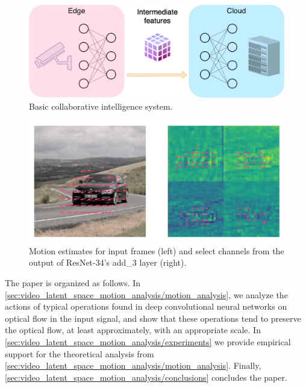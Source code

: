 \begin{figure}[htbp]
    \centering
    \vspace{\baselineskip}%
    \includegraphics[width=\columnwidth]{img/video_latent_space_motion_analysis/CI_system.png}%
    \vspace{0.5\baselineskip}%
    \caption{Basic collaborative intelligence system.}
    \label{fig:video_latent_space_motion_analysis/CI_system}
\end{figure}

\begin{figure}[htbp]
    \centering
    \includegraphics[width=\columnwidth]{img/video_latent_space_motion_analysis/mv_car.png}
    \caption{%
        Motion estimates for input frames (left) and
        select channels from the output of ResNet-34's add\_3 layer (right).
    }
    \label{fig:video_latent_space_motion_analysis/mv_overview}
\end{figure}

The paper is organized as follows. In \cref{sec:video_latent_space_motion_analysis/motion_analysis}, we analyze the actions of typical operations found in deep convolutional neural networks on optical flow in the input signal, and show that these operations tend to preserve the optical flow, at least approximately, with an appropriate scale. In \cref{sec:video_latent_space_motion_analysis/experiments} we provide empirical support for the theoretical analysis from \cref{sec:video_latent_space_motion_analysis/motion_analysis}. %
Finally, \cref{sec:video_latent_space_motion_analysis/conclusions} concludes the paper.


